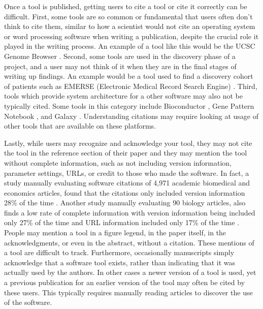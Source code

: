 \documentclass{article}
\begin{document}
Once a tool is published, getting users to cite a tool or cite it correctly can be difficult. First, some tools are so common or fundamental that users often don't think to cite them, similar to how a scientist would not cite an operating system or word processing software when writing a publication, despite the crucial role it played in the writing process. An example of a tool like this would be the UCSC Genome Browser \cite{ucsc, kent_human_2002}. Second, some tools are used in the discovery phase of a project, and a user may not think of it when they are in the final stages of writing up findings. An example would be a tool used to find a discovery cohort of patients such as EMERSE (Electronic Medical Record Search Engine) \cite{hanauer_supporting_2015}. Third, tools which provide system architecture for a other software may also not be typically cited. Some tools in this category include Bioconductor \cite{bioconductor}, Gene Pattern Notebook \cite{reich_genepattern_2017}, and Galaxy \cite{the_galaxy_community_galaxy_2022}. Understanding citations may require looking at usage of other tools that are available on these platforms.

Lastly, while users may recognize and acknowledge your tool, they may not cite the tool in the reference section of their paper and they may mention the tool without complete information, such as not including version information, parameter settings, URLs, or credit to those who made the software.  In fact, a study manually evaluating software citations of 4,971 academic biomedical and economics articles, found that the citations only included version information  28\% of the time \cite{howison_software_2016}.  Another study manually evaluating 90 biology articles, also finds a low rate of complete information with version information being included only 27\% of the time and URL information included only 17\% of the time \cite{du_softcite_2021}. People may mention a tool in a figure legend, in the paper itself, in the acknowledgments, or even in the abstract, without a citation. These mentions of a tool are difficult to track. Furthermore, occasionally manuscripts simply acknowledge that a software tool exists, rather than indicating that it was actually used by the authors. In other cases a newer version of a tool is used, yet a previous publication for an earlier version of the tool may often be cited by these users. This typically requires manually reading articles to discover the use of the software. 
\end{document}
